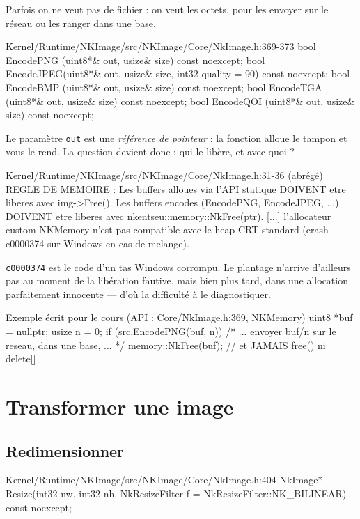 Parfois on ne veut pas de fichier : on veut les octets, pour les envoyer sur le
réseau ou les ranger dans une base.

\begin{nkcode}{Kernel/Runtime/NKImage/src/NKImage/Core/NkImage.h:369-373}
bool EncodePNG (uint8*& out, usize& size) const noexcept;
bool EncodeJPEG(uint8*& out, usize& size, int32 quality = 90) const noexcept;
bool EncodeBMP (uint8*& out, usize& size) const noexcept;
bool EncodeTGA (uint8*& out, usize& size) const noexcept;
bool EncodeQOI (uint8*& out, usize& size) const noexcept;
\end{nkcode}

Le paramètre \texttt{out} est une \emph{référence de pointeur} : la fonction
alloue le tampon et vous le rend. La question devient donc : qui le libère, et
avec quoi ?

\begin{nkcode}{Kernel/Runtime/NKImage/src/NKImage/Core/NkImage.h:31-36 (abrégé)}
 REGLE DE MEMOIRE :
   Les buffers alloues via l'API statique DOIVENT etre liberes avec img->Free().
   Les buffers encodes (EncodePNG, EncodeJPEG, ...) DOIVENT etre liberes avec
   nkentseu::memory::NkFree(ptr).
   [...] l'allocateur custom NKMemory n'est pas compatible avec le heap CRT
   standard (crash c0000374 sur Windows en cas de melange).
\end{nkcode}

\texttt{c0000374} est le code d'un tas Windows corrompu. Le plantage n'arrive
d'ailleurs pas au moment de la libération fautive, mais bien plus tard, dans une
allocation parfaitement innocente — d'où la difficulté à le diagnostiquer.

\begin{nkcode}{Exemple écrit pour le cours (API : Core/NkImage.h:369, NKMemory)}
uint8 *buf = nullptr;
usize  n   = 0;
if (src.EncodePNG(buf, n)) {
    /* ... envoyer buf/n sur le reseau, dans une base, ... */
    memory::NkFree(buf);          // et JAMAIS free() ni delete[]
}
\end{nkcode}

\section{Transformer une image}

\subsection{Redimensionner}

\begin{nkcode}{Kernel/Runtime/NKImage/src/NKImage/Core/NkImage.h:404}
NkImage* Resize(int32 nw, int32 nh, NkResizeFilter f = NkResizeFilter::NK_BILINEAR) const noexcept;
\end{nkcode}

